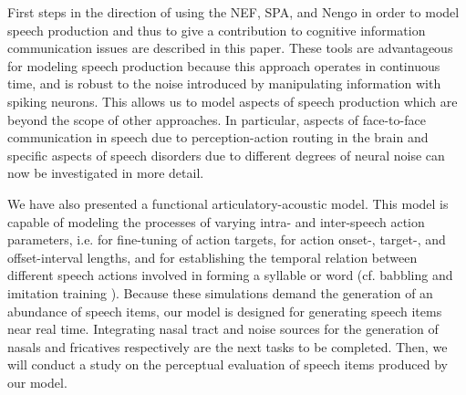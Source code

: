 \documentclass[conference]{IEEEtran}
\begin{document}
First steps in the direction of using the NEF, SPA, and Nengo
in order to model speech production and thus to give a contribution
to cognitive information communication issues
\cite{Baranyi2012} are
described in this paper. These tools are advantageous
for modeling speech production because this
approach operates in continuous time, and is robust to the
noise introduced by manipulating information with spiking neurons.
This allows us to model aspects of speech production
which are beyond the scope of other approaches. In particular,
aspects of face-to-face communication in speech due to
perception-action routing in the brain and specific aspects of speech
disorders due to different degrees of neural noise
can now be investigated in more detail.

We have also presented a functional articulatory-acoustic model.
This model is capable of modeling the processes of varying
intra- and inter-speech action parameters, i.e. for fine-tuning of
action targets, for action onset-, target-, and offset-interval
lengths, and for establishing the temporal relation between
different speech actions involved in
forming a syllable or word (cf. babbling and
imitation training \cite{kroger2009,kroger2014}). Because these
simulations demand the generation of an abundance of speech items,
our model is designed for generating speech items near real time.
Integrating nasal tract and noise sources for the generation of nasals
and fricatives respectively are the next tasks to be completed.
Then, we will conduct a study on the perceptual evaluation
of speech items produced by our model.




\end{document}
